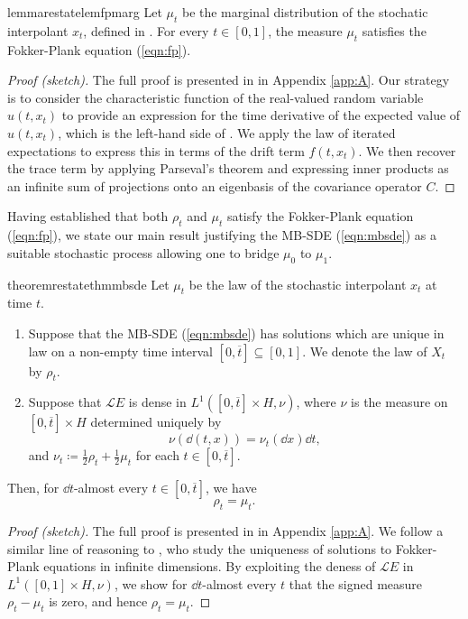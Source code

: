 \begin{restatable}{lemma}{restatelemfpmarg}\label{lem:fpmarg}
  Let \(\mu_{t}\) be the marginal distribution of the stochatic interpolant \(x_{t}\), defined in . For every \(t \in [0, 1]\), the measure \(\mu_{t}\) satisfies the Fokker-Plank equation (\ref{eqn:fp}).
\end{restatable}
\begin{proof}[Proof (sketch)]
  The full proof is presented in  in Appendix \ref{app:A}. Our strategy is to consider the characteristic function of the real-valued random variable \(u(t, x_{t})\) to provide an expression for the time derivative of the expected value of \(u(t, x_{t})\), which is the left-hand side of . We apply the law of iterated expectations to express this in terms of the drift term \(f(t, x_{t})\). We then recover the trace term by applying Parseval's theorem and expressing inner products as an infinite sum of projections onto an eigenbasis of the covariance operator \(C\).
\end{proof}

Having established that both \(\rho_{t}\) and \(\mu_{t}\) satisfy the Fokker-Plank equation (\ref{eqn:fp}), we state our main result justifying the MB-SDE (\ref{eqn:mbsde}) as a suitable stochastic process allowing one to bridge \(\mu_{0}\) to \(\mu_{1}\).
\begin{restatable}{theorem}{restatethmmbsde}\label{thm:mbsde}
  Let \(\mu_{t}\) be the law of the stochastic interpolant \(x_{t}\) at time \(t\).
  \begin{enumerate}
    \item \label{ass:uniquelaw} Suppose that the MB-SDE (\ref{eqn:mbsde}) has solutions which are unique in law on a non-empty time interval \([0, \overline{t}] \subseteq [0, 1]\). We denote the law of \(X_{t}\) by \(\rho_{t}\).
    \item \label{ass:densespace} Suppose that \(\mathcal{L}E\) is dense in \(L^{1}([0, \overline{t} ]\times H, \nu)\), where \(\nu\) is the measure on \([0, \overline{t}] \times H\) determined uniquely by
      \[
        \nu(\dd{(t, x)}) = \nu_{t}(\dd{x}) \dd{t},
      \]
      and \(\nu_{t} \coloneqq \frac{1}{2} \rho_{t} + \frac{1}{2} \mu_{t}\) for each \(t \in [0, \overline{t}]\).

  \end{enumerate}

  Then, for \(\dd{t}\)-almost every \(t \in [0, \overline{t}]\), we have
  \[
    \rho_{t} = \mu_{t}.
  \]
\end{restatable}
\begin{proof}[Proof (sketch)]
  The full proof is presented in  in Appendix \ref{app:A}. We follow a similar line of reasoning to \citet[][Theorem 2.1]{bogachev2010uniquenesssolutionsfokkerplanckequations}, who study the uniqueness of solutions to Fokker-Plank equations in infinite dimensions. By exploiting the deness of \(\mathcal{L}E\) in \(L^{1}([0, 1] \times H, \nu)\), we show for \(\dd{t}\)-almost every \(t\) that the signed measure \(\rho_{t} - \mu_{t}\) is zero, and hence \(\rho_{t} = \mu_{t}\).
\end{proof}

